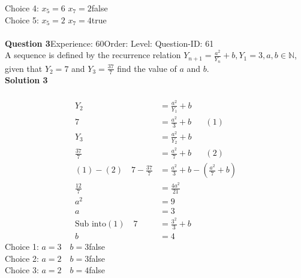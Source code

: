 \documentclass{article}
\begin{document}
Choice 4: \hspace{20pt}$x_5=6 \,\, x_7=2$\hspace{20pt}false\\
Choice 5: \hspace{20pt}$x_5=2 \,\, x_7=4$\hspace{20pt}true\\
\\[4pt]
\noindent\textbf{Question 3}\hspace{20pt}Experience: 60\hspace{20pt}Order: \hspace{20pt}Level: \hspace{20pt}Question-ID: 61\\[2pt]
A sequence is defined by the recurrence relation $Y_{n+1}=\displaystyle\frac{a^2}{Y_n}+b, Y_1=3, a,b \in \mathbb{N}$, given that $Y_2=7$ and $Y_3=\displaystyle\frac{37}{7}$ find the value of $a$ and $b$.\\[4pt]
\noindent\textbf{Solution 3}\\[2pt]
\\[-35pt]\begin{align*}
Y_2&=\displaystyle\frac{a^2}{Y_1}+b\\[2pt]
7&=\displaystyle\frac{a^2}{3}+b\hspace{20pt}(1)\\[12pt]
Y_3&=\displaystyle\frac{a^2}{Y_2}+b\\[2pt]
\displaystyle\frac{37}{7}&=\displaystyle\frac{a^2}{7}+b\hspace{20pt}(2)\\[2pt]
(1)-(2)\quad 7-\displaystyle\frac{37}{7}&=\frac{a^2}{3}+b-\left(\frac{a^2}{7}+b\right)\\[2pt]
\displaystyle\frac{12}{7}&=\displaystyle\frac{4a^2}{21}\\[2pt]
a^2&=9\\[2pt]
a&=3\\[12pt]
\text{Sub into} (1)\quad 7&=\displaystyle\frac{3^2}{3}+b\\[2pt]
b&=4
\end{align*}
Choice 1: \hspace{20pt}$a=3\quad b=3$\hspace{20pt}false\\
Choice 2: \hspace{20pt}$a=2\quad b=3$\hspace{20pt}false\\
Choice 3: \hspace{20pt}$a=2\quad b=4$\hspace{20pt}false\\
\end{document}
